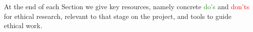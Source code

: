 At the end of each Section we give key resources, namely concrete \textcolor{ForestGreen}{do's} and \textcolor{red}{don'ts} for ethical research, relevant to that stage on the project, and tools to guide ethical work. 


